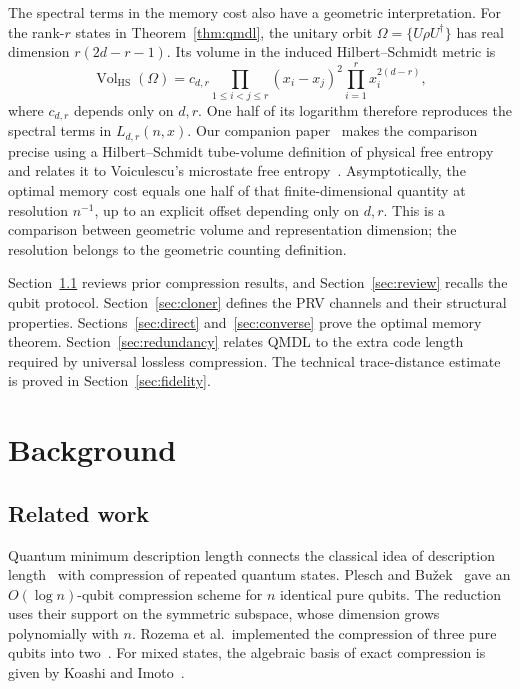 \documentclass[a4paper,onecolumn,11pt]{quantumarticle}
\begin{document}
The spectral terms in the memory cost also have a geometric
interpretation. For the rank-$r$ states in Theorem~\ref{thm:qmdl},
the unitary orbit $\Omega=\{U\rho U^\dagger\}$ has real dimension
$r(2d-r-1)$. Its volume in the induced Hilbert--Schmidt metric is
\[
\operatorname{Vol}_{\mathrm{HS}}(\Omega)
=c_{d,r}\prod_{1\le i<j\le r}(x_i-x_j)^2
\prod_{i=1}^r x_i^{2(d-r)},
\]
where $c_{d,r}$ depends only on $d,r$. One half of its logarithm
therefore reproduces the spectral terms in $L_{d,r}(n,x)$.
Our companion paper~\cite{paper1} makes the comparison precise
using a Hilbert--Schmidt tube-volume definition of physical free
entropy and relates it to Voiculescu's microstate free
entropy~\cite{voiculescu1993analogues,voiculescu1994analogues,voiculescu2002free}.
Asymptotically, the optimal memory cost equals one half of that
finite-dimensional quantity at resolution $n^{-1}$, up to an
explicit offset depending only on $d,r$. This is a comparison
between geometric volume and representation dimension; the
resolution belongs to the geometric counting definition.

Section~\ref{sec:related_works} reviews prior compression results,
and Section~\ref{sec:review} recalls the qubit protocol.
Section~\ref{sec:cloner} defines the PRV channels and their structural
properties. Sections~\ref{sec:direct} and~\ref{sec:converse} prove the
optimal memory theorem. Section~\ref{sec:redundancy} relates QMDL to
the extra code length required by universal lossless compression.
The technical trace-distance estimate is proved in
Section~\ref{sec:fidelity}.


\section{Background}\label{sec:background} 
\subsection{Related work}\label{sec:related_works}
Quantum minimum description length connects the classical idea of
description length~\cite{rissanen1978modeling} with compression of
repeated quantum states. Plesch and Bu\v{z}ek~\cite{plesch2010efficient}
gave an $O(\log n)$-qubit compression scheme for $n$ identical pure
qubits. The reduction uses their support on the symmetric subspace,
whose dimension grows polynomially with $n$. Rozema et al.~implemented
the compression of three pure qubits into two~\cite{rozema2014quantum}.
For mixed states, the algebraic basis of exact compression is given
by Koashi and Imoto~\cite{koashi2001compressibility,koashi2001possible}.
\end{document}
